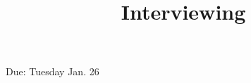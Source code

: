 \documentclass[a4, 12pt]{article}
\title{Interviewing}
\author{}
\date{}
\begin{document}
\maketitle

Due: Tuesday Jan. 26
\end{document}
